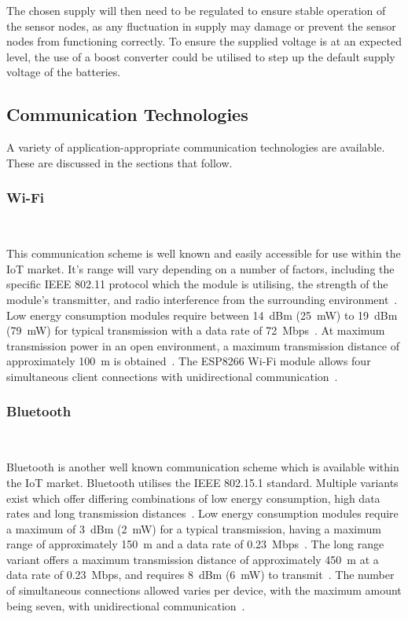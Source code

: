 \documentclass[10pt,twocolumn]{witseiepaper}
\begin{document}
			The chosen supply will then need to be regulated to ensure stable operation of the sensor nodes, as any fluctuation in supply may damage or prevent the sensor nodes from functioning correctly. To ensure the supplied voltage is at an expected level, the use of a boost converter could be utilised to step up the default supply voltage of the batteries.
	
	\subsection{Communication Technologies}
	
		A variety of application-appropriate communication technologies are available. These are discussed in the sections that follow.
		
		\subsubsection{Wi-Fi} $   $
		
			This communication scheme is well known and easily accessible for use within the IoT market. It's range will vary depending on a number of factors, including the specific IEEE 802.11 protocol which the module is utilising, the strength of the module's transmitter, and radio interference from the surrounding environment~\cite{802.11}. Low energy consumption modules require between 14~dBm (25~mW) to 19~dBm (79~mW) for typical transmission with a data rate of 72~Mbps~\cite{esp12e}. At maximum transmission power in an open environment, a maximum transmission distance of approximately 100~m is obtained~\cite{esp12e}. The ESP8266 \mbox{Wi-Fi} module allows four simultaneous client connections with unidirectional communication~\cite{esp12e}.

		\subsubsection{Bluetooth} $   $
		
			Bluetooth is another well known communication scheme which is available within the IoT market. Bluetooth utilises the IEEE 802.15.1 standard. Multiple variants exist which offer differing combinations of low energy consumption, high data rates and long transmission distances~\cite{802.15.2}. Low energy consumption modules require a maximum of 3~dBm (2~mW) for a typical transmission, having a maximum range of approximately 150~m and a data rate of 0.23~Mbps~\cite{BLE112}. The long range variant offers a maximum transmission distance of approximately 450~m at a data rate of 0.23~Mbps, and requires 8~dBm (6~mW) to transmit~\cite{BLE112LR}. The number of simultaneous connections allowed varies per device, with the maximum amount being seven, with unidirectional communication~\cite{bluetooth-users}.
\end{document}
